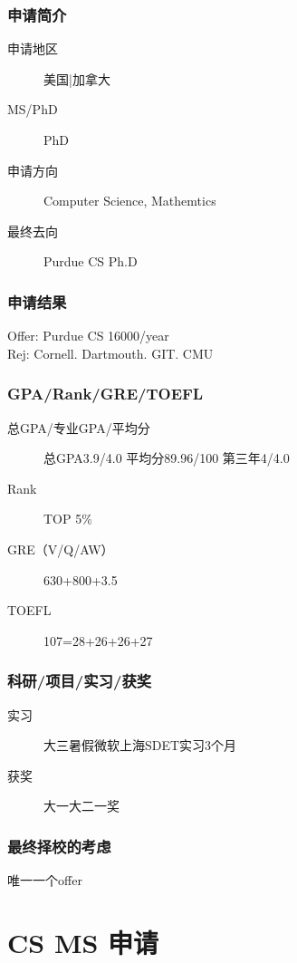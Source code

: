 \documentclass[11pt,fleqn,openany]{book} %
\begin{document}
\noindent\begin{minipage}[t]{0.45\textwidth}
\subsection*{申请简介}
\begin{description}
\item[申请地区] 美国|加拿大
\item[MS/PhD] PhD
\item[申请方向] Computer Science, Mathemtics
\item[最终去向] Purdue CS Ph.D
\end{description}
\end{minipage}
\hfill
\begin{minipage}[t]{0.45\textwidth}
\subsection*{申请结果}
\noindent Offer: Purdue CS 16000/year\\
Rej: Cornell. Dartmouth. GIT. CMU
\end{minipage}
\subsection*{GPA/Rank/GRE/TOEFL}
\begin{description}
\item[总GPA/专业GPA/平均分] 总GPA3.9/4.0 平均分89.96/100 第三年4/4.0
\item[Rank] TOP 5\%
\item[GRE（V/Q/AW）] 630+800+3.5
\item[TOEFL] 107=28+26+26+27
\end{description}

\subsection*{科研/项目/实习/获奖}
\begin{description}
\item[实习] 大三暑假微软上海SDET实习3个月
\item[获奖] 大一大二一奖
\end{description}
\subsection*{最终择校的考虑}
唯一一个offer
\clearpage
\cleardoublepage
\chapter{CS MS 申请}
\end{document}
